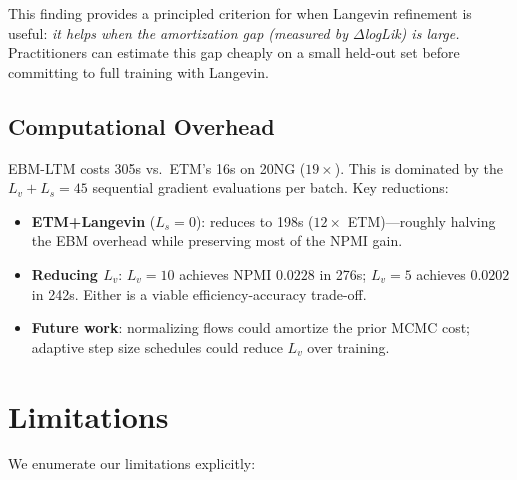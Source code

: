 \documentclass[10pt]{article}
\begin{document}
This finding provides a principled criterion for when Langevin refinement is useful:
\emph{it helps when the amortization gap (measured by $\Delta$logLik) is large.}
Practitioners can estimate this gap cheaply on a small held-out set before
committing to full training with Langevin.

\subsection{Computational Overhead}

EBM-LTM costs 305s vs.\ ETM's 16s on 20NG ($19\times$). This is dominated by
the $L_v + L_s = 45$ sequential gradient evaluations per batch. Key reductions:
\begin{itemize}
    \item \textbf{ETM+Langevin} ($L_s = 0$): reduces to 198s ($12\times$ ETM)---roughly
    halving the EBM overhead while preserving most of the NPMI gain.
    \item \textbf{Reducing $L_v$}: $L_v = 10$ achieves NPMI $0.0228$ in 276s;
    $L_v = 5$ achieves $0.0202$ in 242s. Either is a viable efficiency-accuracy trade-off.
    \item \textbf{Future work}: normalizing flows \citep{rezende2015} could amortize the
    prior MCMC cost; adaptive step size schedules could reduce $L_v$ over training.
\end{itemize}

\section{Limitations}
\label{sec:limitations}

We enumerate our limitations explicitly:
\end{document}
